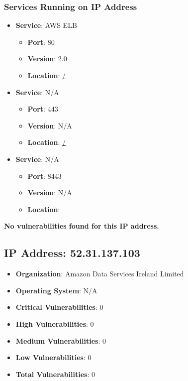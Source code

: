 \documentclass{article}
\begin{document}
\subsubsection*{Services Running on IP Address}

\begin{itemize}
    
        \item \textbf{Service}: AWS ELB
        \begin{itemize}
            \item \textbf{Port}: 80
            \item \textbf{Version}:  2.0 
            \item \textbf{Location}: \href{ / }{ / }
        \end{itemize}
    
        \item \textbf{Service}: N/A
        \begin{itemize}
            \item \textbf{Port}: 443
            \item \textbf{Version}:  N/A 
            \item \textbf{Location}: \href{ / }{ / }
        \end{itemize}
    
        \item \textbf{Service}: N/A
        \begin{itemize}
            \item \textbf{Port}: 8443
            \item \textbf{Version}:  N/A 
            \item \textbf{Location}: \href{  }{  }
        \end{itemize}
    
\end{itemize}


\textbf{No vulnerabilities found for this IP address.}




\clearpage



\subsection{IP Address: 52.31.137.103}

\begin{itemize}
    \item \textbf{Organization}: Amazon Data Services Ireland Limited
    \item \textbf{Operating System}:  N/A 
    \item \textbf{Critical Vulnerabilities}: 0
    \item \textbf{High Vulnerabilities}: 0
    \item \textbf{Medium Vulnerabilities}: 0
    \item \textbf{Low Vulnerabilities}: 0
    \item \textbf{Total Vulnerabilities}: 0
\end{itemize}
\end{document}
